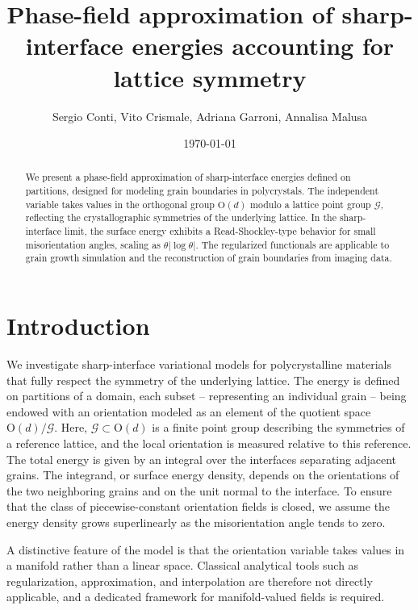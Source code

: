 \documentclass[a4paper,reqno]{amsart}
\title[Approximation of sharp-interface energies accounting for lattice symmetry]{Phase-field approximation of sharp-interface energies accounting for lattice symmetry}
\author{Sergio Conti, Vito Crismale, Adriana Garroni, Annalisa Malusa}
\date{\today}
\theoremstyle{remark}
\newcommand{\G}{\mathcal{G}}
\newcommand{\On}{\mathrm{O}(d)}
\newcommand{\OnG}{{\On}/{\G}}
\numberwithin{equation}{section}
\begin{document}
\maketitle
\begin{abstract}
	We present a phase-field approximation of sharp-interface  energies defined on partitions, designed for modeling grain boundaries in polycrystals. The independent variable takes values in
the orthogonal group $\On$ modulo a lattice point group $\G$, reflecting the crystallographic symmetries of the underlying lattice. In the sharp-interface limit, the surface energy
exhibits a Read-Shockley-type behavior for small misorientation angles, scaling as $\theta|\log\theta|$.
The regularized functionals are applicable to grain growth simulation and the reconstruction of grain boundaries from imaging data.
\end{abstract}
\tableofcontents

\section{Introduction}\label{sec:intro}

We investigate sharp-interface variational models for polycrystalline materials that fully respect the symmetry of the underlying lattice.
The energy is defined on partitions of a domain, each subset -- representing an individual grain -- being endowed with  an orientation modeled as an element of the quotient space $\OnG$. Here, $\G\subset\On$ is a finite point group describing the symmetries of a reference lattice, and the local orientation is measured relative to this reference.
The total energy is given by an integral over the interfaces separating adjacent grains.
The
integrand, or surface energy density,  depends on the orientations of the two neighboring grains and on the unit normal to the interface.
To ensure that the class of piecewise-constant orientation fields is closed, we assume the
energy density grows superlinearly as the misorientation angle tends to zero.

A distinctive feature of the model is that the orientation variable takes values in a manifold rather than a linear space. Classical analytical tools such as regularization, approximation, and interpolation are therefore not directly applicable, and a dedicated framework for manifold-valued fields is required.
\end{document}
